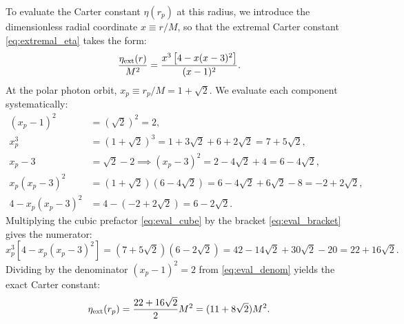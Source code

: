 To evaluate the Carter constant $\eta(r_p)$ at this radius, we introduce the dimensionless radial coordinate $x \equiv r/M$, so that the extremal Carter constant \eqref{eq:extremal_eta} takes the form:
\begin{equation}
    \frac{\eta_{\rm ext}(r)}{M^2} = \frac{x^3\left[ 4 - x(x - 3)^2 \right]}{(x - 1)^2}.
    \label{eq:extremal_eta_dimensionless}
\end{equation}
At the polar photon orbit, $x_p \equiv r_p/M = 1 + \sqrt{2}$. We evaluate each component systematically:
\begin{align}
    (x_p - 1)^2 &= \left(\sqrt{2}\right)^2 = 2, \label{eq:eval_denom} \\
    x_p^3 &= (1 + \sqrt{2})^3 = 1 + 3\sqrt{2} + 6 + 2\sqrt{2} = 7 + 5\sqrt{2}, \label{eq:eval_cube} \\
    x_p - 3 &= \sqrt{2} - 2 \implies (x_p - 3)^2 = 2 - 4\sqrt{2} + 4 = 6 - 4\sqrt{2}, \label{eq:eval_sq} \\
    x_p(x_p - 3)^2 &= (1 + \sqrt{2})(6 - 4\sqrt{2}) = 6 - 4\sqrt{2} + 6\sqrt{2} - 8 = -2 + 2\sqrt{2}, \label{eq:eval_prod} \\
    4 - x_p(x_p - 3)^2 &= 4 - (-2 + 2\sqrt{2}) = 6 - 2\sqrt{2}. \label{eq:eval_bracket}
\end{align}
Multiplying the cubic prefactor \eqref{eq:eval_cube} by the bracket \eqref{eq:eval_bracket} gives the numerator:
\begin{equation}
    x_p^3\left[ 4 - x_p(x_p - 3)^2 \right] = (7 + 5\sqrt{2})(6 - 2\sqrt{2}) = 42 - 14\sqrt{2} + 30\sqrt{2} - 20 = 22 + 16\sqrt{2}.
\end{equation}
Dividing by the denominator $(x_p - 1)^2 = 2$ from \eqref{eq:eval_denom} yields the exact Carter constant:
\begin{equation}
    \eta_{\rm ext}(r_p) = \frac{22 + 16\sqrt{2}}{2} M^2 = (11 + 8\sqrt{2}) M^2.
    \label{eq:eta_extremal_polar}
\end{equation}

